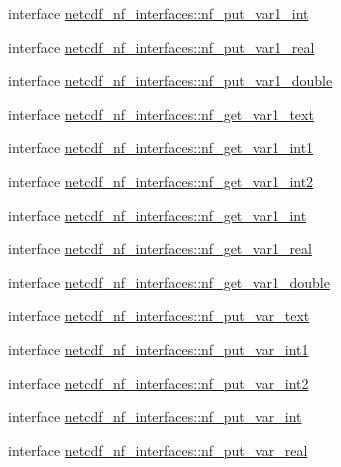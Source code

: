 \begin{DoxyCompactItemize}
\item 
interface \hyperlink{interfacenetcdf__nf__interfaces_1_1nf__put__var1__int}{netcdf\+\_\+nf\+\_\+interfaces\+::nf\+\_\+put\+\_\+var1\+\_\+int}
\item 
interface \hyperlink{interfacenetcdf__nf__interfaces_1_1nf__put__var1__real}{netcdf\+\_\+nf\+\_\+interfaces\+::nf\+\_\+put\+\_\+var1\+\_\+real}
\item 
interface \hyperlink{interfacenetcdf__nf__interfaces_1_1nf__put__var1__double}{netcdf\+\_\+nf\+\_\+interfaces\+::nf\+\_\+put\+\_\+var1\+\_\+double}
\item 
interface \hyperlink{interfacenetcdf__nf__interfaces_1_1nf__get__var1__text}{netcdf\+\_\+nf\+\_\+interfaces\+::nf\+\_\+get\+\_\+var1\+\_\+text}
\item 
interface \hyperlink{interfacenetcdf__nf__interfaces_1_1nf__get__var1__int1}{netcdf\+\_\+nf\+\_\+interfaces\+::nf\+\_\+get\+\_\+var1\+\_\+int1}
\item 
interface \hyperlink{interfacenetcdf__nf__interfaces_1_1nf__get__var1__int2}{netcdf\+\_\+nf\+\_\+interfaces\+::nf\+\_\+get\+\_\+var1\+\_\+int2}
\item 
interface \hyperlink{interfacenetcdf__nf__interfaces_1_1nf__get__var1__int}{netcdf\+\_\+nf\+\_\+interfaces\+::nf\+\_\+get\+\_\+var1\+\_\+int}
\item 
interface \hyperlink{interfacenetcdf__nf__interfaces_1_1nf__get__var1__real}{netcdf\+\_\+nf\+\_\+interfaces\+::nf\+\_\+get\+\_\+var1\+\_\+real}
\item 
interface \hyperlink{interfacenetcdf__nf__interfaces_1_1nf__get__var1__double}{netcdf\+\_\+nf\+\_\+interfaces\+::nf\+\_\+get\+\_\+var1\+\_\+double}
\item 
interface \hyperlink{interfacenetcdf__nf__interfaces_1_1nf__put__var__text}{netcdf\+\_\+nf\+\_\+interfaces\+::nf\+\_\+put\+\_\+var\+\_\+text}
\item 
interface \hyperlink{interfacenetcdf__nf__interfaces_1_1nf__put__var__int1}{netcdf\+\_\+nf\+\_\+interfaces\+::nf\+\_\+put\+\_\+var\+\_\+int1}
\item 
interface \hyperlink{interfacenetcdf__nf__interfaces_1_1nf__put__var__int2}{netcdf\+\_\+nf\+\_\+interfaces\+::nf\+\_\+put\+\_\+var\+\_\+int2}
\item 
interface \hyperlink{interfacenetcdf__nf__interfaces_1_1nf__put__var__int}{netcdf\+\_\+nf\+\_\+interfaces\+::nf\+\_\+put\+\_\+var\+\_\+int}
\item 
interface \hyperlink{interfacenetcdf__nf__interfaces_1_1nf__put__var__real}{netcdf\+\_\+nf\+\_\+interfaces\+::nf\+\_\+put\+\_\+var\+\_\+real}

\end{DoxyCompactItemize}
